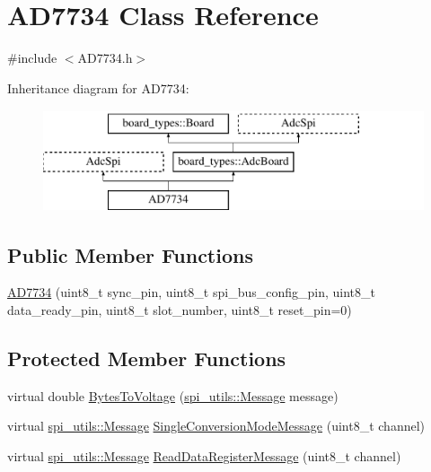 \hypertarget{classAD7734}{}\section{A\+D7734 Class Reference}
\label{classAD7734}


{\ttfamily \#include $<$A\+D7734.\+h$>$}

Inheritance diagram for A\+D7734\+:\begin{figure}[H]
\begin{center}
\leavevmode
\includegraphics[height=3.000000cm]{classAD7734}
\end{center}
\end{figure}
\subsection*{Public Member Functions}
\begin{DoxyCompactItemize}
\item 
\mbox{\hyperlink{classAD7734_afd200ee71660ecdad75dfe2ed558be68}{A\+D7734}} (uint8\+\_\+t sync\+\_\+pin, uint8\+\_\+t spi\+\_\+bus\+\_\+config\+\_\+pin, uint8\+\_\+t data\+\_\+ready\+\_\+pin, uint8\+\_\+t slot\+\_\+number, uint8\+\_\+t reset\+\_\+pin=0)
\end{DoxyCompactItemize}
\subsection*{Protected Member Functions}
\begin{DoxyCompactItemize}
\item 
virtual double \mbox{\hyperlink{classAD7734_aa13b49141e69a45508998004a208afdc}{Bytes\+To\+Voltage}} (\mbox{\hyperlink{structspi__utils_1_1Message}{spi\+\_\+utils\+::\+Message}} message)
\item 
virtual \mbox{\hyperlink{structspi__utils_1_1Message}{spi\+\_\+utils\+::\+Message}} \mbox{\hyperlink{classAD7734_af677fbfbae0ec1c78b453ceb4a6736ec}{Single\+Conversion\+Mode\+Message}} (uint8\+\_\+t channel)
\item 
virtual \mbox{\hyperlink{structspi__utils_1_1Message}{spi\+\_\+utils\+::\+Message}} \mbox{\hyperlink{classAD7734_a6fa5e7c2bd8cde50dccb328d36f12516}{Read\+Data\+Register\+Message}} (uint8\+\_\+t channel)
\end{DoxyCompactItemize}

